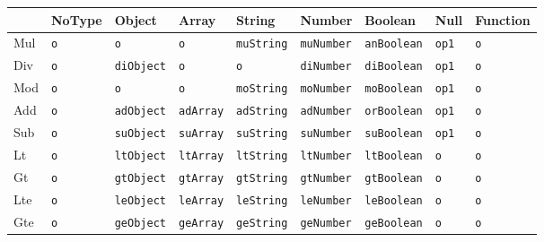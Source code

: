 \begin{table}[H]
    \begin{tabular}{|l|l|l|l|l|l|l|l|l|}
    \hline
    \cellcolor[HTML]{000000}{\color[HTML]{000000} } &   NoType &          Object &          Array &          String &          Number &          Boolean &          Null & Function \\ \hline
    Mul                                             & \verb|o| &        \verb|o| &       \verb|o| & \verb|muString| & \verb|muNumber| & \verb|anBoolean| &    \verb|op1| & \verb|o| \\ \hline
    Div                                             & \verb|o| & \verb|diObject| &       \verb|o| &        \verb|o| & \verb|diNumber| & \verb|diBoolean| &    \verb|op1| & \verb|o| \\ \hline
    Mod                                             & \verb|o| &        \verb|o| &       \verb|o| & \verb|moString| & \verb|moNumber| & \verb|moBoolean| &    \verb|op1| & \verb|o| \\ \hline
    Add                                             & \verb|o| & \verb|adObject| & \verb|adArray| & \verb|adString| & \verb|adNumber| & \verb|orBoolean| &    \verb|op1| & \verb|o| \\ \hline
    Sub                                             & \verb|o| & \verb|suObject| & \verb|suArray| & \verb|suString| & \verb|suNumber| & \verb|suBoolean| &    \verb|op1| & \verb|o| \\ \hline
    Lt                                              & \verb|o| & \verb|ltObject| & \verb|ltArray| & \verb|ltString| & \verb|ltNumber| & \verb|ltBoolean| &      \verb|o| & \verb|o| \\ \hline
    Gt                                              & \verb|o| & \verb|gtObject| & \verb|gtArray| & \verb|gtString| & \verb|gtNumber| & \verb|gtBoolean| &      \verb|o| & \verb|o| \\ \hline
    Lte                                             & \verb|o| & \verb|leObject| & \verb|leArray| & \verb|leString| & \verb|leNumber| & \verb|leBoolean| &      \verb|o| & \verb|o| \\ \hline
    Gte                                             & \verb|o| & \verb|geObject| & \verb|geArray| & \verb|geString| & \verb|geNumber| & \verb|geBoolean| &      \verb|o| & \verb|o| \\ \hline

\end{tabular}
\end{table}
